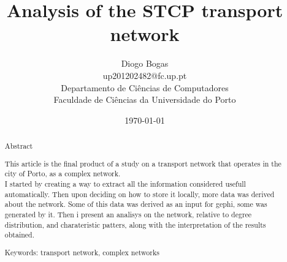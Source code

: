 \documentclass[12pt]{article}
\title{Analysis of the STCP transport network}
\author{Diogo Bogas \\ 
        up201202482@fc.up.pt \\ 
        Departamento de Ciências de Computadores\\
        Faculdade de Ciências da Universidade do Porto\\
        }
\date{\today}
\begin{document}
\maketitle
{}

\begin{abstract}



\begin{center}
Abstract\\
\end{center}

This article is the final product of a study on a transport network that operates in the city of Porto, as a complex network.\\ 
I started by creating a way to extract all the information considered usefull automatically. Then upon deciding on how to store it locally, more data was derived about the network. Some of this data was derived as an input for gephi, some was generated by it. Then i present an analisys on the network, relative to degree distribution, and charateristic patters, along with the interpretation of the results obtained.


Keywords: transport network, complex networks

\end{abstract}
\end{document}
